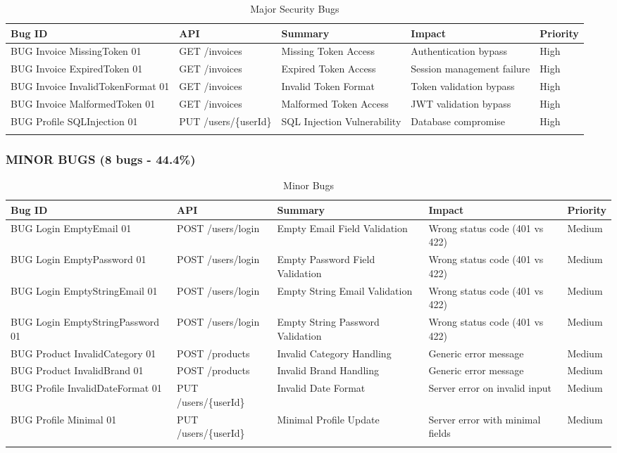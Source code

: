 \documentclass[12pt,a4paper]{article}
\begin{document}
  \begin{longtable}{|p{3.5cm}|p{3cm}|p{2.5cm}|p{3cm}|p{1.5cm}|}
  \hline
  \textbf{Bug ID} & \textbf{API} & \textbf{Summary} & \textbf{Impact} & \textbf{Priority} \\
  \hline
  BUG Invoice MissingToken 01 & GET /invoices & Missing Token Access & Authentication bypass & High \\
  \hline
  BUG Invoice ExpiredToken 01 & GET /invoices & Expired Token Access & Session management failure & High \\
  \hline
  BUG Invoice InvalidTokenFormat 01 & GET /invoices & Invalid Token Format & Token validation bypass & High \\
  \hline
  BUG Invoice MalformedToken 01 & GET /invoices & Malformed Token Access & JWT validation bypass & High \\
  \hline
  BUG Profile SQLInjection 01 & PUT /users/\{userId\} & SQL Injection Vulnerability & Database compromise & High \\
  \hline
  \caption{Major Security Bugs}
  \end{longtable}

  \subsubsection{MINOR BUGS (8 bugs - 44.4\%)}

  \begin{longtable}{|p{4cm}|p{3cm}|p{2.5cm}|p{2.5cm}|p{1.5cm}|}
  \hline
  \textbf{Bug ID} & \textbf{API} & \textbf{Summary} & \textbf{Impact} & \textbf{Priority} \\
  \hline
  BUG Login EmptyEmail 01 & POST /users/login & Empty Email Field Validation & Wrong status code (401 vs 422) & Medium \\
  \hline
  BUG Login EmptyPassword 01 & POST /users/login & Empty Password Field Validation & Wrong status code (401 vs 422) & Medium \\
  \hline
  BUG Login EmptyStringEmail 01 & POST /users/login & Empty String Email Validation & Wrong status code (401 vs 422) & Medium \\
  \hline
  BUG Login EmptyStringPassword 01 & POST /users/login & Empty String Password Validation & Wrong status code (401 vs 422) & Medium \\
  \hline
  BUG Product InvalidCategory 01 & POST /products & Invalid Category Handling & Generic error message & Medium \\
  \hline
  BUG Product InvalidBrand 01 & POST /products & Invalid Brand Handling & Generic error message & Medium \\
  \hline
  BUG Profile InvalidDateFormat 01 & PUT /users/\{userId\} & Invalid Date Format & Server error on invalid input & Medium \\
  \hline
  BUG Profile Minimal 01 & PUT /users/\{userId\} & Minimal Profile Update & Server error with minimal fields & Medium \\
  \hline
  \caption{Minor Bugs}
  \end{longtable}
\end{document}
